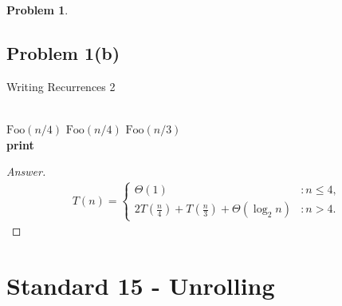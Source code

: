 \documentclass[11pt]{article}
\theoremstyle{definition}
\theoremstyle{definition}
\newtheorem{required}{Problem}
\theoremstyle{definition}
\begin{document}
\begin{required}
\newpage


\subsection{Problem 1(b)}

\begin{algorithm}
\caption{Writing Recurrences 2}\label{alg:Recurrence2}
\begin{algorithmic}[1]
\Return
\EndIf

\noindent \\
\State $\text{Foo}(n/4)$
\State $\text{Foo}(n/4)$
\State $\text{Foo}(n/3)$ \\

	\State \textbf{print} 
\EndFor
\EndProcedure
\end{algorithmic}
\end{algorithm}
\end{required}

\begin{proof}[Answer]
\begin{align*}
T(n) = \begin{cases}
\Theta(1) & : n \leq 4, \\
2T(\frac{n}{4}) + T(\frac{n}{3}) + \Theta(\log_{2} n) & : n > 4.
\end{cases}
\end{align*}

\end{proof}

\newpage

\section{Standard 15 - Unrolling}
\end{document}
